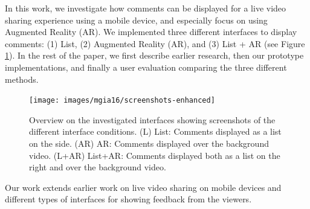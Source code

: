 

In this work, we investigate how comments can be displayed for a live video sharing experience using a mobile device, and especially focus on using Augmented Reality (AR). We implemented three different interfaces to display comments: (1) List, (2) Augmented Reality (AR), and (3) List + AR (see Figure \ref{fig:mgia16:conditions}). In the rest of the paper, we first describe earlier research, then our prototype implementations, and finally a user evaluation comparing the three different methods. 

\begin{figure}
  \texttt{[image: images/mgia16/screenshots-enhanced]}
  \caption{Overview on the investigated interfaces showing screenshots of the different interface conditions. (L) List: Comments displayed as a list on the side. (AR) AR: Comments displayed over the background video. (L+AR) List+AR: Comments displayed both as a list on the right and over the background video. }
  \label{fig:mgia16:conditions}
\end{figure}


Our work extends earlier work on live video sharing on mobile devices and different types of interfaces for showing feedback from the viewers. 


